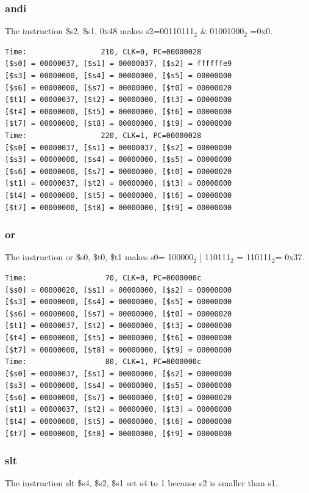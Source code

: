 \documentclass[a4paper,12pt]{article}
\begin{document}
\subsubsection{andi}
\par The instruction \$s2, \$s1, 0x48 makes s2=00110111$_2$ \& 01001000$_2$ =0x0.
\begin{lstlisting}
Time:                 210, CLK=0, PC=00000028
[$s0] = 00000037, [$s1] = 00000037, [$s2] = ffffffe9
[$s3] = 00000000, [$s4] = 00000000, [$s5] = 00000000
[$s6] = 00000000, [$s7] = 00000000, [$t0] = 00000020
[$t1] = 00000037, [$t2] = 00000000, [$t3] = 00000000
[$t4] = 00000000, [$t5] = 00000000, [$t6] = 00000000
[$t7] = 00000000, [$t8] = 00000000, [$t9] = 00000000
Time:                 220, CLK=1, PC=00000028
[$s0] = 00000037, [$s1] = 00000037, [$s2] = 00000000
[$s3] = 00000000, [$s4] = 00000000, [$s5] = 00000000
[$s6] = 00000000, [$s7] = 00000000, [$t0] = 00000020
[$t1] = 00000037, [$t2] = 00000000, [$t3] = 00000000
[$t4] = 00000000, [$t5] = 00000000, [$t6] = 00000000
[$t7] = 00000000, [$t8] = 00000000, [$t9] = 00000000
\end{lstlisting}

\subsubsection{or}
\par The instruction or \$s0, \$t0, \$t1 makes s0= 100000$_2$ | 110111$_2$ = 110111$_2$= 0x37.

\begin{lstlisting}
Time:                  70, CLK=0, PC=0000000c
[$s0] = 00000020, [$s1] = 00000000, [$s2] = 00000000
[$s3] = 00000000, [$s4] = 00000000, [$s5] = 00000000
[$s6] = 00000000, [$s7] = 00000000, [$t0] = 00000020
[$t1] = 00000037, [$t2] = 00000000, [$t3] = 00000000
[$t4] = 00000000, [$t5] = 00000000, [$t6] = 00000000
[$t7] = 00000000, [$t8] = 00000000, [$t9] = 00000000
Time:                  80, CLK=1, PC=0000000c
[$s0] = 00000037, [$s1] = 00000000, [$s2] = 00000000
[$s3] = 00000000, [$s4] = 00000000, [$s5] = 00000000
[$s6] = 00000000, [$s7] = 00000000, [$t0] = 00000020
[$t1] = 00000037, [$t2] = 00000000, [$t3] = 00000000
[$t4] = 00000000, [$t5] = 00000000, [$t6] = 00000000
[$t7] = 00000000, [$t8] = 00000000, [$t9] = 00000000
\end{lstlisting}

\subsubsection{slt}
\par The instruction slt \$s4, \$s2, \$s1 set s4 to 1 because s2 is smaller than s1.
\end{document}

